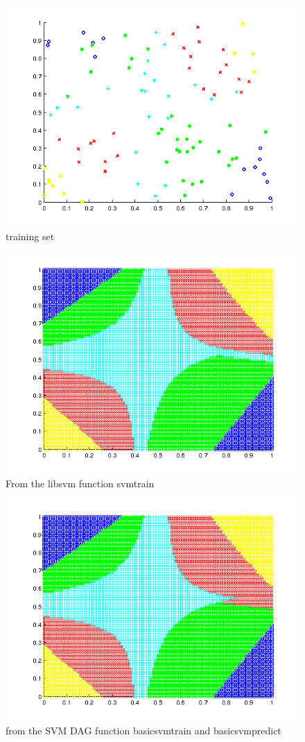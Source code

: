 \documentclass[11pt]{article}
\begin{document}
\begin{figure}[H]
	\centering
	\includegraphics{1}
	\caption{training set}
\end{figure}
\begin{figure}[H]
	\centering
	\includegraphics{2}
	\caption{From the libsvm function svmtrain}
\end{figure}
\begin{figure}[H]
	\centering
	\includegraphics{3}
	\caption{from the SVM DAG function basicsvmtrain and basicsvmpredict}
\end{figure}
\end{document}

